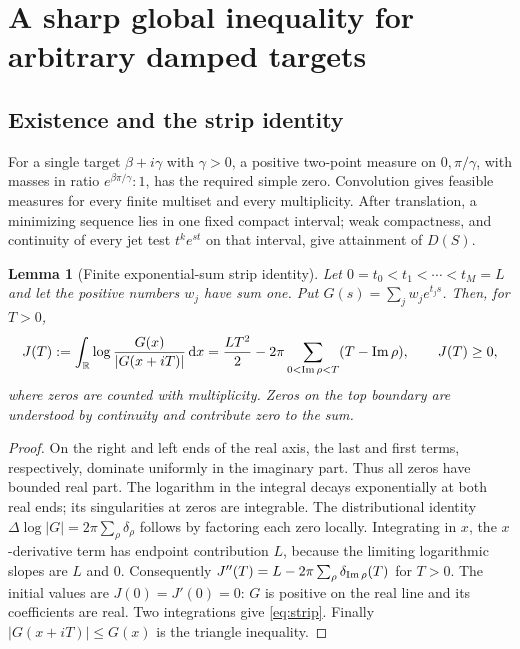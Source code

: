 \documentclass[11pt]{article}
\newtheorem{lemma}[theorem]{Lemma}
\theoremstyle{remark}\newtheorem{remark}[theorem]{Remark}
\newcommand{\R}{\mathbb R}\newcommand{\C}{\mathbb C}
\newcommand{\dd}{\,\mathrm d}\newcommand{\supp}{\operatorname{supp}}
\newcommand{\abs}[1]{\left\lvert#1\right\rvert}
\begin{document}
\section{A sharp global inequality for arbitrary damped targets}

\subsection{Existence and the strip identity}

For a single target $\beta+i\gamma$ with $\gamma>0$, a positive two-point
measure on $0,\pi/\gamma$, with masses in ratio
$e^{\beta\pi/\gamma}:1$, has the required simple zero. Convolution gives
feasible measures for every finite multiset and every multiplicity. After
translation, a minimizing sequence lies in one fixed compact interval;
weak compactness, and continuity of every jet test $t^ke^{st}$ on that
interval, give attainment of $D(S)$.

\begin{lemma}[Finite exponential-sum strip identity]\label{lem:strip}
Let $0=t_0<t_1<\cdots<t_M=L$ and let the positive numbers $w_j$ have sum
one. Put $G(s)=\sum_jw_je^{t_js}$. Then, for $T>0$,
\begin{equation}\label{eq:strip}
 J(T):=\int_\R\log\frac{G(x)}{\abs{G(x+iT)}}\dd x
 =\frac{LT^2}{2}-2\pi\sum_{0<\Ima\rho<T}(T-\Ima\rho),
 \qquad J(T)\ge0,
\end{equation}
where zeros are counted with multiplicity. Zeros on the top boundary are
understood by continuity and contribute zero to the sum.
\end{lemma}

\begin{proof}
On the right and left ends of the real axis, the last and first terms,
respectively, dominate uniformly in the imaginary part. Thus all zeros have
bounded real part. The logarithm in the integral decays exponentially at
both real ends; its singularities at zeros are integrable. The distributional
identity
$\Delta\log\abs{G}=2\pi\sum_\rho\delta_\rho$ follows by factoring each
zero locally. Integrating in $x$, the $x$-derivative term has endpoint
contribution $L$, because the limiting logarithmic slopes are $L$ and $0$.
Consequently
$J''(T)=L-2\pi\sum_\rho\delta_{\operatorname{Im}\rho}(T)$ for $T>0$.
The initial values are $J(0)=J'(0)=0$: $G$ is positive on the real line
and its coefficients are real. Two integrations give \eqref{eq:strip}.
Finally $\abs{G(x+iT)}\le G(x)$ is the triangle inequality.
\end{proof}
\end{document}
